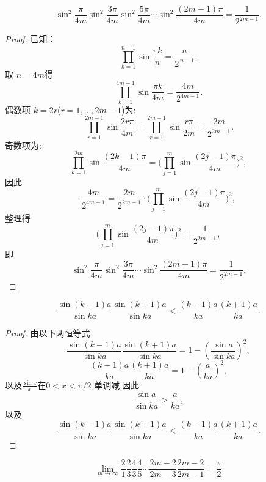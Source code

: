 \begin{lemma}\label{lem:Stirling-2}
    $$\sin^2\frac{\pi}{4m}\sin^2\frac{3\pi}{4m}\sin^2\frac{5\pi}{4m}\cdots\sin^2\frac{(2m-1)\pi}{4m} = \frac{1}{2^{2m-1}}.$$
\end{lemma}

\begin{proof}
    已知：$$
        \prod_{k=1}^{n-1}\sin\frac{\pi k}{n}=\frac{n}{2^{\,n-1}}.$$
    取 \(n=4m\)得
    \[
        \prod_{k=1}^{4m-1}\sin\frac{\pi k}{4m}=\frac{4m}{2^{4m-1}}.
    \]
    偶数项 \(k=2r\)(\(r=1,\dots,2m-1\))为:
    \[
        \prod_{r=1}^{2m-1}\sin\frac{2r\pi}{4m}
        =\prod_{r=1}^{2m-1}\sin\frac{r\pi}{2m}
        =\frac{2m}{2^{2m-1}}.
    \]
    奇数项为:
    \[
        \prod_{k=1}^{2m}\sin\frac{(2k-1) \pi}{4m}
        =\Bigg(\prod_{j=1}^{m}\sin\frac{(2j-1)\pi}{4m}\Bigg)^2,
    \]
    因此
    \[
        \frac{4m}{2^{4m-1}}
        =\frac{2m}{2^{2m-1}}\cdot
        \Bigg(\prod_{j=1}^{m}\sin\frac{(2j-1)\pi}{4m}\Bigg)^2,
    \]
    整理得
    \[
        \Bigg(\prod_{j=1}^{m}\sin\frac{(2j-1)\pi}{4m}\Bigg)^2
        =\frac{1}{2^{2m-1}},
    \]
    即
    \[
        \sin^2\frac{\pi}{4m}\sin^2\frac{3\pi}{4m}\cdots\sin^2\frac{(2m-1)\pi}{4m}
        =\frac{1}{2^{2m-1}}.
    \]
\end{proof}

\begin{lemma}\label{lem:Stirling-3}
    $$\frac{\sin (k-1)a}{\sin ka}\frac{\sin (k+1)a}{\sin ka} < \frac{(k-1)a}{ka}\frac{(k+1)a}{ka}.$$
\end{lemma}

\begin{proof}
    由以下两恒等式
    $$\frac{\sin (k-1)a}{\sin ka}\frac{\sin (k+1)a}{\sin ka} = 1-\left(\frac{\sin a}{\sin ka}\right)^2, $$
    $$\frac{(k-1)a}{ka}\frac{(k+1)a}{ka} = 1-\left(\frac{a}{ka}\right)^2, $$
    以及$\frac{\sin x}{x}$在$0 < x < \pi/2$ 单调减,因此$$
        \frac{\sin a}{\sin ka} > \frac{a}{ka}, $$
    以及
    $$\frac{\sin (k-1)a}{\sin ka}\frac{\sin (k+1)a}{\sin ka} < \frac{(k-1)a}{ka}\frac{(k+1)a}{ka}.$$
\end{proof}

\begin{lemma}[Wallis 公式]\label{lem:Stirling-4}
    $$\lim_{m \to \infty} \frac{2}{1}\frac{2}{3}\frac{4}{3}\frac{4}{5}\cdots\frac{2m-2}{2m-3}\frac{2m-2}{2m-1} = \frac{\pi}{2}$$
\end{lemma}

